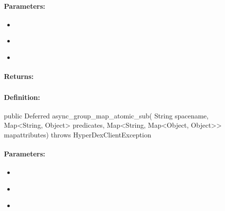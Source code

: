 \paragraph{Parameters:}
\begin{itemize}[noitemsep]
\item {}\\

\item {}\\

\item {}\\

\end{itemize}

\paragraph{Returns:}


\pagebreak
\subsubsection{}
\label{api:java:async_group_map_atomic_sub}


\paragraph{Definition:}
\begin{javacode}
public Deferred async_group_map_atomic_sub(
        String spacename,
        Map<String, Object> predicates,
        Map<String, Map<Object, Object>> mapattributes) throws HyperDexClientException
\end{javacode}

\paragraph{Parameters:}
\begin{itemize}[noitemsep]
\item {}\\

\item {}\\

\item {}\\

\end{itemize}

